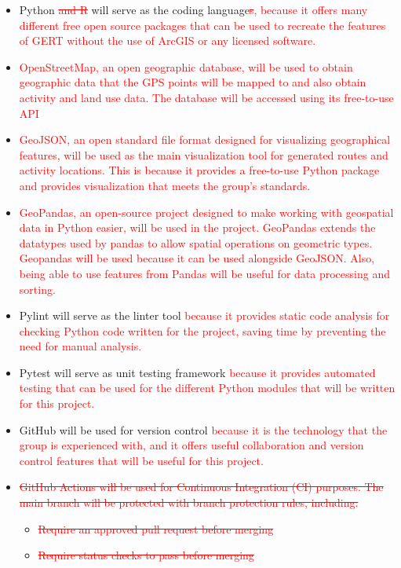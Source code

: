\documentclass{article}
\begin{document}
\begin{itemize}
\item Python \textcolor{red}{\sout{and R}} will serve as the coding language\textcolor{red}{\sout{s}, because it offers many different free open source packages that can be used to recreate the features of GERT without the use of ArcGIS or any licensed software.}
\item \textcolor{red}{OpenStreetMap, an open geographic database, will be used to obtain geographic data that the GPS points will be mapped to and also obtain activity and land use data. The database will be accessed using its free-to-use API}
\item \textcolor{red}{GeoJSON, an open standard file format designed for visualizing geographical features, will be used as the main visualization tool for generated routes and activity locations. This is because it provides a free-to-use Python package and provides visualization that meets the group's standards.}
\item \textcolor{red}{GeoPandas, an open-source project designed to make working with geospatial data in Python easier, will be used in the project. GeoPandas extends the datatypes used by pandas to allow spatial operations on geometric types. Geopandas will be used because it can be used alongside GeoJSON. Also, being able to use features from Pandas will be useful for data processing and sorting.}
\item Pylint will serve as the linter tool \textcolor{red}{ because it provides static code analysis for checking Python code written for the project, saving time by preventing the need for manual analysis.}
\item Pytest will serve as unit testing framework \textcolor{red}{because it provides automated testing that can be used for the different Python modules that will be written for this project.}
\item GitHub will be used for version control \textcolor{red}{because it is the technology that the group is experienced with, and it offers useful collaboration and version control features that will be useful for this project.}
\item \textcolor{red}{\sout{GitHub Actions will be used for Continuous Integration (CI) purposes. The main branch will be protected with branch protection rules, including:}}
    \begin{itemize}
        \item \textcolor{red}{\sout{Require an approved pull request before merging}}
        \item \textcolor{red}{\sout{Require status checks to pass before merging}}

\end{itemize}
\end{itemize}
\end{document}
